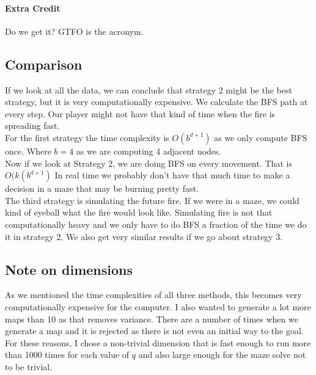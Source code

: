 \documentclass[11pt]{scrartcl} %
\begin{document}
\paragraph{Extra Credit}
Do we get it? GTFO is the acronym. 
\subsection{Comparison}
If we look at all the data, we can conclude that strategy 2 might be the best strategy, but it is very computationally expensive. We calculate the BFS path at every step. Our player might not have that kind of time when the fire is spreading fast.\vspace{2em}\\
For the first strategy the time complexity is $O(b^{d+1})$ as we only compute BFS once. Where $b = 4$ as we are computing 4 adjacent nodes.\vspace{2em}\\
Now if we look at Strategy 2, we are doing BFS on every movement. That is $O(k(b^{d+1})$ In real time we probably don't have that much time to make a decision in a maze that may be burning pretty fast.\vspace{2em}\\
The third strategy is simulating the future fire. If we were in a maze, we could kind of eyeball what the fire would look like. Simulating fire is not that computationally heavy and we only have to do BFS a fraction of the time we do it in strategy 2. We also get very similar results if we go about strategy 3. 



\subsection{Note on dimensions}
As we mentioned the time complexities of all three methods, this becomes very computationally expensive for the computer. I also wanted to generate a lot more maps than 10 as that removes variance. There are a number of times when we generate a map and it is rejected as there is not even an initial way to the goal. For these reasons, I chose a non-trivial dimension that is fast enough to run more than 1000 times for each value of $q$ and also large enough for the maze solve not to be trivial. 
\end{document}
